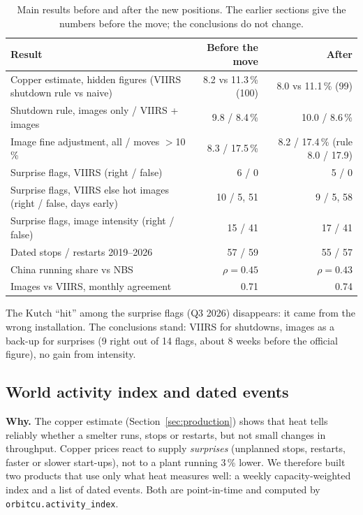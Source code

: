 \documentclass[10pt,a4paper]{article}
\newcommand{\code}[1]{\texttt{\small #1}}
\begin{document}
\begin{table}[H]
\centering\small
\begin{tabularx}{\textwidth}{@{}X r r@{}}
\toprule
\textbf{Result} & \textbf{Before the move} & \textbf{After}\\
\midrule
Copper estimate, hidden figures (VIIRS shutdown rule vs naive) & 8.2 vs 11.3\,\% (100) & 8.0 vs 11.1\,\% (99)\\
Shutdown rule, images only / VIIRS + images & 9.8 / 8.4\,\% & 10.0 / 8.6\,\%\\
Image fine adjustment, all / moves $>$10\,\% & 8.3 / 17.5\,\% & 8.2 / 17.4\,\% (rule 8.0 / 17.9)\\
Surprise flags, VIIRS (right / false) & 6 / 0 & 5 / 0\\
Surprise flags, VIIRS else hot images (right / false, days early) & 10 / 5, 51 & 9 / 5, 58\\
Surprise flags, image intensity (right / false) & 15 / 41 & 17 / 41\\
Dated stops / restarts 2019--2026 & 57 / 59 & 55 / 57\\
China running share vs NBS & $\rho=0.45$ & $\rho=0.43$\\
Images vs VIIRS, monthly agreement & 0.71 & 0.74\\
\bottomrule
\end{tabularx}
\caption{Main results before and after the new positions. The earlier sections give the numbers before the move; the conclusions do not change.}
\end{table}

The Kutch ``hit'' among the surprise flags (Q3 2026) disappears: it came from the wrong installation. The conclusions stand: VIIRS for shutdowns, images as a back-up for surprises (9 right out of 14 flags, about 8 weeks before the official figure), no gain from intensity.

\subsection{World activity index and dated events}\label{sec:index}

\textbf{Why.} The copper estimate (Section~\ref{sec:production}) shows that heat tells reliably whether a smelter runs, stops or restarts, but not small changes in throughput. Copper prices react to supply \emph{surprises} (unplanned stops, restarts, faster or slower start-ups), not to a plant running 3\,\% lower. We therefore built two products that use only what heat measures well: a weekly capacity-weighted index and a list of dated events. Both are point-in-time and computed by \code{orbitcu.activity\_index}.
\end{document}
